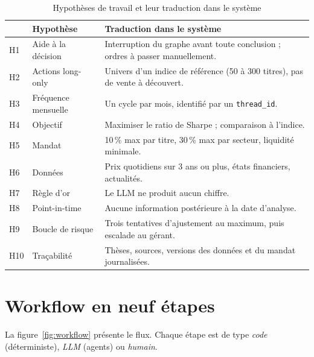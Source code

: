 \documentclass[11pt,a4paper]{report}
\begin{document}
\begin{table}[H]
\centering\small
\caption{Hypothèses de travail et leur traduction dans le système}\label{tab:hyp}
\begin{tabularx}{\textwidth}{@{}l l Y@{}}
\toprule
& Hypothèse & Traduction dans le système \\
\midrule
H1 & Aide à la décision & Interruption du graphe avant toute conclusion ; ordres à passer manuellement. \\
H2 & Actions long-only & Univers d'un indice de référence (50 à 300 titres), pas de vente à découvert. \\
H3 & Fréquence mensuelle & Un cycle par mois, identifié par un \texttt{thread\_id}. \\
H4 & Objectif & Maximiser le ratio de Sharpe ; comparaison à l'indice. \\
H5 & Mandat & 10\,\% max par titre, 30\,\% max par secteur, liquidité minimale. \\
H6 & Données & Prix quotidiens sur 3 ans ou plus, états financiers, actualités. \\
H7 & Règle d'or & Le LLM ne produit aucun chiffre. \\
H8 & Point-in-time & Aucune information postérieure à la date d'analyse. \\
H9 & Boucle de risque & Trois tentatives d'ajustement au maximum, puis escalade au gérant. \\
H10 & Traçabilité & Thèses, sources, versions des données et du mandat journalisées. \\
\bottomrule
\end{tabularx}
\end{table}

\section{Workflow en neuf étapes}
La figure~\ref{fig:workflow} présente le flux. Chaque étape est de type \emph{code} (déterministe),
\emph{LLM} (agents) ou \emph{humain}.
\end{document}
